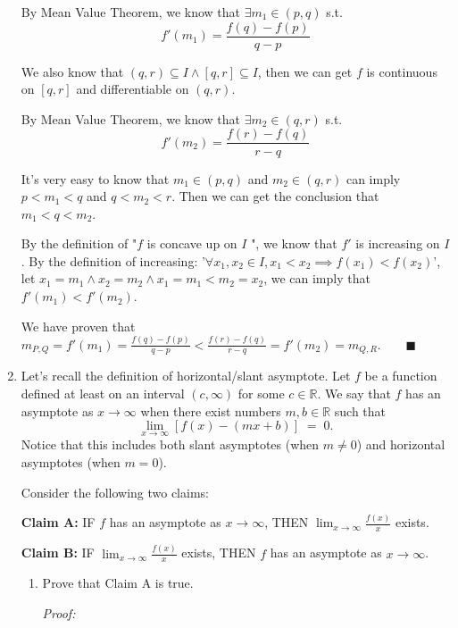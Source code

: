 \documentclass[12pt]{exam}
\newcommand {\DS} [1] {${\displaystyle #1}$}
\newcommand{\vv}{\vspace{.1cm}}
\newcommand{\R}{\mathbb{R}}
\begin{document}
\begin{enumerate}
By Mean Value Theorem, we know that $\exists m_1\in(p,q)$ s.t.
$$
    f'(m_1)=\frac{f(q)-f(p)}{q-p}
$$

We also know that $(q,r)\subseteq I \land [q,r]\subseteq I$, then we can get $f$ is continuous on $[q,r]$ and differentiable on $(q,r)$.

By Mean Value Theorem, we know that $\exists m_2\in(q,r)$ s.t.
$$
    f'(m_2)=\frac{f(r)-f(q)}{r-q}
$$

It's very easy to know that $m_1\in(p,q)$ and $m_2\in(q,r)$ can imply $p<m_1<q$ and $q<m_2<r$. Then we can get the conclusion that $m_1<q<m_2$.

By the definition of "$f$ is concave up on $I$ ", we know that $f'$ is increasing on $I$. By the definition of increasing: '$\forall x_1, x_2\in I, x_1<x_2 \implies f(x_1)<f(x_2)$', let $x_1=m_1 \land x_2=m_2 \land x_1=m_1<m_2=x_2$, we can imply that $f'(m_1)<f'(m_2)$.

We have proven that $m_{P,Q}=f'(m_1)=\frac{f(q)-f(p)}{q-p} < \frac{f(r)-f(q)}{r-q}=f'(m_2)=m_{Q,R}. \qquad\blacksquare$

\newpage

\item  Let's recall the definition of horizontal/slant asymptote.  Let $f$ be a function defined at least on an interval $(c,\infty)$ for some $c \in \R$.
We say that $f$ has an asymptote as $x \to \infty$ when there exist numbers $m, b \in \R$ such that
	$$	
		\lim_{x \to \infty} \left[ f(x) - \left( mx + b \right) \right] \; = \; 0.
	$$
Notice that this includes both slant asymptotes (when $m \neq 0$) and horizontal asymptotes (when $m =0$).
	
Consider the following two claims:	
			\begin{center}
				{\bf Claim A:} \quad \quad
					IF $f$ has an asymptote as $x \to \infty$,  \quad
					THEN \DS{\lim_{x \to \infty} \frac{f(x)}{x}} exists.
				
				{\bf Claim B:} \quad \quad 		
					IF \DS{\lim_{x \to \infty} \frac{f(x)}{x}} exists, \quad
					THEN $f$ has an asymptote as $x \to \infty$.
			\end{center}
	\begin{enumerate}
		\item Prove that Claim A is true.
		
		\vv
		
		\emph{Proof:}
		
		\vv
		

\end{enumerate}
\end{enumerate}
\end{document}
